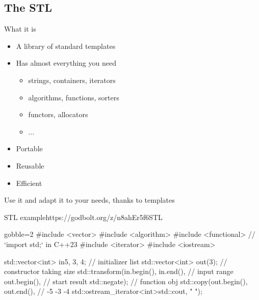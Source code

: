 \subsection[STL]{The STL}

\begin{frame}[fragile]
  \begin{block}{What it is}
    \begin{itemize}
    \item A library of standard templates
    \item Has almost everything you need
      \begin{itemize}
      \item strings, containers, iterators
      \item algorithms, functions, sorters
      \item functors, allocators
      \item ...
      \end{itemize}
    \item Portable
    \item Reusable
    \item Efficient
    \end{itemize}
  \end{block}
  \pause
  \begin{exampleblock}{Use it}
    and adapt it to your needs, thanks to templates
  \end{exampleblock}
\end{frame}

\begin{frame}[fragile]
  \begin{exampleblockGB}{STL example}{https://godbolt.org/z/n8ahEr5f6}{STL}
    \begin{cppcode*}{gobble=2}
      #include <vector>
      #include <algorithm>
      #include <functional>     // `import std;` in C++23
      #include <iterator>
      #include <iostream>

      std::vector<int> in{5, 3, 4};    // initializer list
      std::vector<int> out(3);  // constructor taking size
      std::transform(in.begin(), in.end(),  // input range
                     out.begin(),          // start result
                     std::negate{});       // function obj
      std::copy(out.begin(), out.end(),    // -5 -3 -4
      std::ostream_iterator<int>{std::cout, " "});
    \end{cppcode*}
  \end{exampleblockGB}
\end{frame}

